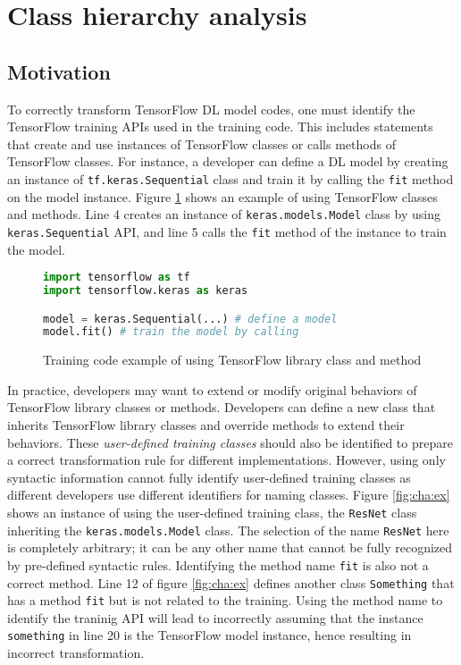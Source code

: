 \section{Class hierarchy analysis}\label{sec:cha}

\subsection{Motivation}

To correctly transform TensorFlow DL model codes,
one must identify the TensorFlow training APIs used in the training code.
This includes statements that create and use instances of TensorFlow classes or
calls methods of TensorFlow classes. 
For instance, a developer can define a DL model by creating an instance of
{\tt tf.keras.Sequential} class and train it by calling the
{\tt fit} method on the model instance.
Figure \ref{fig:cha:tfex} shows an example of using
TensorFlow classes and methods.
Line 4 creates an instance of {\tt keras.models.Model} class by using
{\tt keras.Sequential} API, and line 5 calls the {\tt fit} method
of the instance to train the model.

\begin{figure}[h]
\begin{lstlisting}[language=Python]
import tensorflow as tf
import tensorflow.keras as keras

model = keras.Sequential(...) # define a model
model.fit() # train the model by calling 
\end{lstlisting}
  \caption{Training code example of using TensorFlow library class and method}
  \label{fig:cha:tfex}
\end{figure}

In practice, developers may want to extend or modify original behaviors
of TensorFlow library classes or methods.  
Developers can define a new class that inherits TensorFlow library classes
and override methods to extend their behaviors. 
These \textit{user-defined training classes}
should also be identified to prepare a correct transformation rule 
for different implementations.  However, using only syntactic information 
cannot fully identify user-defined training classes
as different developers use different identifiers for naming classes.
Figure \ref{fig:cha:ex} shows an instance of using the
user-defined training class, the {\tt ResNet} class inheriting
the {\tt keras.models.Model} class.
The selection of the name {\tt ResNet} here is completely arbitrary;
it can be any other name that cannot be fully recognized by
pre-defined syntactic rules.
Identifying the method name {\tt fit} is also not a correct method.
Line 12 of figure \ref{fig:cha:ex} defines another class {\tt Something}
that has a method {\tt fit} but is not related to the training.
Using the method name to identify the traninig API will lead to
incorrectly assuming that the instance {\tt something} in line 20
is the TensorFlow model instance, hence resulting in incorrect transformation.

